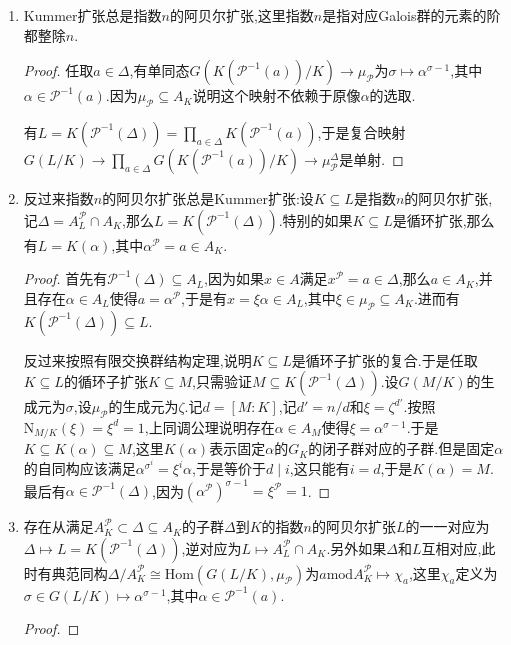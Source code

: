 \begin{enumerate}
	\item Kummer扩张总是指数$n$的阿贝尔扩张,这里指数$n$是指对应Galois群的元素的阶都整除$n$.
	\begin{proof}
		
		任取$a\in\Delta$,有单同态$G(K(\mathscr{P}^{-1}(a))/K)\to\mu_{\mathscr{P}}$为$\sigma\mapsto\alpha^{\sigma-1}$,其中$\alpha\in\mathscr{P}^{-1}(a)$.因为$\mu_{\mathscr{P}}\subseteq A_K$说明这个映射不依赖于原像$\alpha$的选取.
		
		有$L=K(\mathscr{P}^{-1}(\Delta))=\prod_{a\in\Delta}K(\mathscr{P}^{-1}(a))$,于是复合映射$G(L/K)\to\prod_{a\in\Delta}G(K(\mathscr{P}^{-1}(a))/K)\to\mu_{\mathscr{P}}^{\Delta}$是单射.
	\end{proof}
    \item 反过来指数$n$的阿贝尔扩张总是Kummer扩张:设$K\subseteq L$是指数$n$的阿贝尔扩张,记$\Delta=A_L^{\mathscr{P}}\cap A_K$,那么$L=K(\mathscr{P}^{-1}(\Delta))$.特别的如果$K\subseteq L$是循环扩张,那么有$L=K(\alpha)$,其中$\alpha^{\mathscr{P}}=a\in A_K$.
    \begin{proof}
    	
    	首先有$\mathscr{P}^{-1}(\Delta)\subseteq A_L$,因为如果$x\in A$满足$x^{\mathscr{P}}=a\in\Delta$,那么$a\in A_K$,并且存在$\alpha\in A_L$使得$a=\alpha^{\mathscr{P}}$,于是有$x=\xi\alpha\in A_L$,其中$\xi\in\mu_{\mathscr{P}}\subseteq A_K$.进而有$K(\mathscr{P}^{-1}(\Delta))\subseteq L$.
    	
    	反过来按照有限交换群结构定理,说明$K\subseteq L$是循环子扩张的复合.于是任取$K\subseteq L$的循环子扩张$K\subseteq M$,只需验证$M\subseteq K(\mathscr{P}^{-1}(\Delta))$.设$G(M/K)$的生成元为$\sigma$,设$\mu_{\mathscr{P}}$的生成元为$\zeta$.记$d=[M:K]$,记$d'=n/d$和$\xi=\zeta^{d'}$.按照$\mathrm{N}_{M/K}(\xi)=\xi^d=1$,上同调公理说明存在$\alpha\in A_M$使得$\xi=\alpha^{\sigma-1}$.于是$K\subseteq K(\alpha)\subseteq M$,这里$K(\alpha)$表示固定$\alpha$的$G_K$的闭子群对应的子群.但是固定$\alpha$的自同构应该满足$\alpha^{\sigma^i}=\xi^i\alpha$,于是等价于$d\mid i$,这只能有$i=d$,于是$K(\alpha)=M$.最后有$\alpha\in\mathscr{P}^{-1}(\Delta)$,因为$(\alpha^{\mathscr{P}})^{\sigma-1}=\xi^{\mathscr{P}}=1$.
    \end{proof}
    \item 存在从满足$A_K^{\mathscr{P}}\subset\Delta\subseteq A_K$的子群$\Delta$到$K$的指数$n$的阿贝尔扩张$L$的一一对应为$\Delta\mapsto L=K(\mathscr{P}^{-1}(\Delta))$,逆对应为$L\mapsto A_L^{\mathscr{P}}\cap A_K$.另外如果$\Delta$和$L$互相对应,此时有典范同构$\Delta/A_K^{\mathscr{P}}\cong\mathrm{Hom}(G(L/K),\mu_{\mathscr{P}})$为$a\mathrm{mod}A_K^{\mathscr{P}}\mapsto\chi_a$,这里$\chi_a$定义为$\sigma\in G(L/K)\mapsto\alpha^{\sigma-1}$,其中$\alpha\in\mathscr{P}^{-1}(a)$.
    \begin{proof}
    	

\end{proof}
\end{enumerate}

